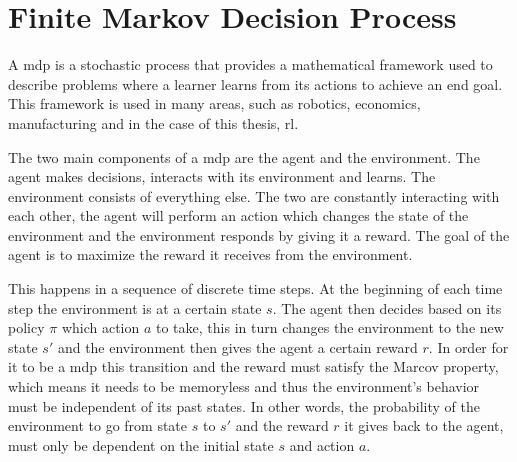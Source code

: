 
\section{Finite Markov Decision Process}

A \acrfull{mdp} is a stochastic process that provides a mathematical framework used to describe problems where a learner learns from its actions to achieve an end goal. This framework is used in many areas, such as robotics, economics, manufacturing and in the case of this thesis, \acrlong{rl}. 

The two main components of a \acrshort{mdp} are the agent and the environment. The agent makes decisions, interacts with its environment and learns. The environment consists of everything else. The two are constantly interacting with each other, the agent will perform an action which changes the state of the environment and the environment responds by giving it a reward. The goal of the agent is to maximize the reward it receives from the environment.

This happens in a sequence of discrete time steps. At the beginning of each time step the environment is at a certain state $s$. The agent then decides based on its policy $\pi$ which action $a$ to take, this in turn changes the environment to the new state $s'$ and the environment then gives the agent a certain reward $r$. In order for it to be a \gls{mdp} this transition and the reward must satisfy the Marcov property, which means it needs to be memoryless and thus the environment's behavior must be independent of its past states. In other words, the probability of the environment to go from state $s$ to $s'$ and the reward $r$ it gives back to the agent, must only be dependent on the initial state $s$ and action $a$.

